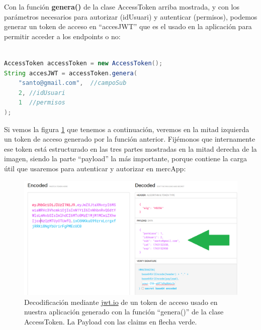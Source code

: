 \documentclass[a4paper,12pt]{report}
\begin{document}
		
		
		Con la función \textbf{genera()} de la clase AccessToken arriba mostrada, y con los parámetros necesarios para autorizar (idUsuari) y autenticar (permisos), podemos generar un token de acceso en ``accesJWT'' que es el usado en la aplicación para permitir acceder a los endpoints o no:
		
		
		
\begin{lstlisting}[language=Java, basicstyle=\ttfamily\footnotesize, keywordstyle=\color{magenta}]

AccessToken accessToken = new AccessToken();
String accesJWT = accessToken.genera(
	"santo@gmail.com",  //campoSub
	2, //idUsuari
	1  //permisos
);


\end{lstlisting}
		
		Si vemos la figura \ref{fig:jwtioMostraPayload} que tenemos a continuación, veremos en la mitad izquierda un token de acceso generado por la función anterior. Fijémonos que internamente ese token está estructurado en las tres partes mostradas en la mitad derecha de la imagen, siendo la parte ``payload'' la más importante, porque contiene la carga útil que usaremos para autenticar y autorizar en mercApp:
		
	
			\setlength{\belowcaptionskip}{3pt}
			\FloatBarrier
			\begin{figure}[H]
				\centering
				\caption{Decodificación mediante \href{https://www.jwt.io}{jwt.io} de un token de acceso usado en nuestra aplicación generado con la función ``genera()'' de la clase AccessToken. La Payload con las claims en flecha verde.}
				\includegraphics[width=1\textwidth]{img/jwtio_mostra_payload.png}

				\label{fig:jwtioMostraPayload} 
			\end{figure}
			\FloatBarrier
\end{document}
